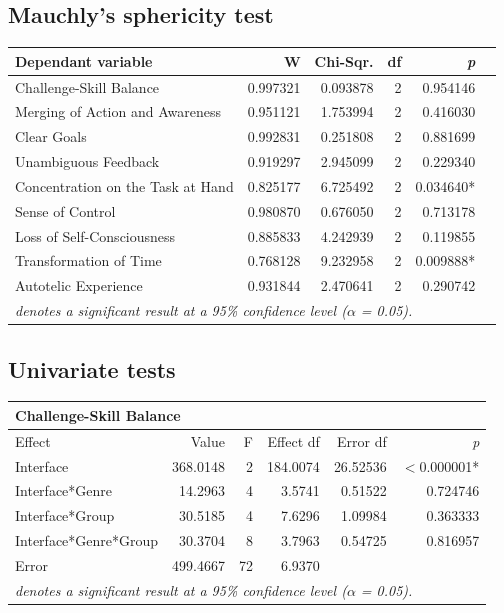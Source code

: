 \subsection{Mauchly's sphericity test}
\label{manova:mauchly}

\begin{table}[h]
	
	\begin{tabular*}{0.71\textwidth}{ l r r r r r }
	\hline	
	Dependant variable & W & Chi-Sqr. & df & \emph{p} \\
	\hline
	Challenge-Skill Balance &0.997321  &	0.093878  &	2 & 	0.954146 \\
	Merging of Action and Awareness &	0.951121 &	1.753994 &	2 &	0.416030\\
	Clear Goals &	0.992831 &	0.251808 	&2 &	0.881699\\
	Unambiguous Feedback &	0.919297 &	2.945099 &	2 &	0.229340\\
	Concentration on the Task at Hand &	0.825177 &	6.725492 &	2 &	0.034640*\\
	Sense of Control &	0.980870 &	0.676050 &	2 &	0.713178\\
	Loss of Self-Consciousness &	0.885833 &	4.242939 &	2 &	0.119855\\
	Transformation of Time &	0.768128 &	9.232958 &	2 &	0.009888*\\
	Autotelic Experience &	0.931844 &	2.470641 &	2 &	0.290742\\
	\hline
	\multicolumn{6}{l}{\emph{{\footnotesize * denotes a significant result at a 95\% confidence level ($\alpha$ = 0.05).}}} \\ 
	

	\end{tabular*}
\end{table}

\subsection{Univariate tests}
\label{manova:univar}
\parindent 0cm


	\begin{tabular*}{0.8\textwidth}{@{\extracolsep{\fill}} l r r r r r }
	\multicolumn{6}{l}{\bf Challenge-Skill Balance} \\
	\hline	
	 Effect & Value & F & Effect df & Error df & \emph{p} \\
	\hline
	Interface & 368.0148  &	2  &	184.0074  &	26.52536 & $<$0.000001* \\
	Interface*Genre &  14.2963  &	4  &	3.5741  &	0.51522  &	0.724746 \\
	Interface*Group &  30.5185  &	4  &	7.6296  &	1.09984  &	0.363333 \\
	Interface*Genre*Group &  30.3704  &	8 & 	3.7963 & 	0.54725  &	0.816957 \\
	Error  &	499.4667  &	72  &	6.9370&&\\
	\hline
	\multicolumn{6}{l}{\emph{{\small * denotes a significant result at a 95\% confidence level ($\alpha$ = 0.05).}}} \\ 

	\end{tabular*} \vspace{0.5cm}  




